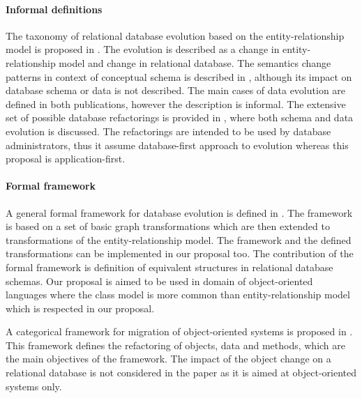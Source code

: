 \documentclass[runningheads]{comsis}
\begin{document}
\paragraph{Informal definitions} The taxonomy of relational database evolution based on the entity-relationship model  is proposed in \cite{Roddick:TaxonomyOnERM}. The evolution is described as a change in entity-relationship model and change in relational database.  The semantics change patterns in context of conceptual schema is described in \cite{Wedemeijer:SemanticChangePatternsInConceptualSchema}, although its impact on database schema or data is not described. The main cases of data evolution are defined in both publications, however the description is informal. The extensive set of possible database refactorings is provided in \cite{Ambler:DbRefactoringBook}, where both schema and data evolution is discussed. The refactorings are intended to be used by database administrators, thus it assume database-first approach to evolution whereas this proposal is application-first.   

\paragraph{Formal framework} A general formal framework for database evolution is defined in \cite{McBrien:formal-framework-transformation}. The framework is based on a set of basic graph transformations which are then extended to transformations of the entity-relationship model. The framework and the defined transformations can be implemented in our proposal too. The contribution of the formal framework is definition of equivalent structures in relational database schemas. Our proposal is aimed to be used in domain of object-oriented languages where the class model is more common than entity-relationship model which is respected in our proposal.

A categorical framework for migration of object-oriented systems is proposed in \cite{Schulz:CategoricalModel}. This framework defines the refactoring of objects, data and methods, which are the main objectives of the framework. The impact of the object change on a relational database is not considered in the paper as it is aimed at object-oriented systems only.
\end{document}
